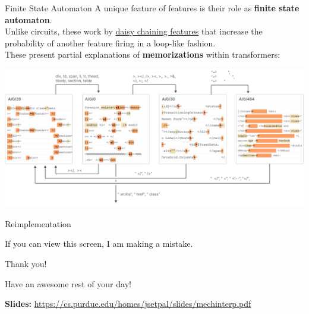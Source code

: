 \documentclass{beamer}
\begin{document}
\begin{frame}{Finite State Automaton}
	A unique feature of features is their role as \textbf{finite state automaton}. \pause \newline \\

	Unlike circuits, these work by \underline{daisy chaining features} that increase the probability of another feature firing in a loop-like fashion. \pause \newline \\

	These present partial explanations of \textbf{memorizations} within transformers:
	\begin{center}
		\includegraphics[width=.8\textwidth]{img/fsa.png}
	\end{center}
\end{frame}

\begin{frame}{Reimplementation}
	\begin{center}
		If you can view this screen, I am making a mistake.
	\end{center}
\end{frame}

\begin{frame}{Thank you!}
	\begin{center}
		Have an awesome rest of your day!
	\end{center}
	\begin{center}
		\textbf{Slides:} {\small \url{https://cs.purdue.edu/homes/jsetpal/slides/mechinterp.pdf}}
	\end{center}
\end{frame}
\end{document}
